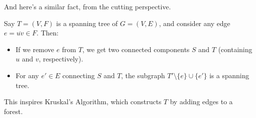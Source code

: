 And here's a similar fact, from the cutting perspective.

\begin{claim}
    Say $T = (V, F)$ is a spanning tree of $G = (V, E)$, and consider any edge $e = \overline{uv} \in F$.  Then:
    \begin{itemize}
        \item If we remove $e$ from $T$, we get two connected components $S$ and $T$ (containing $u$ and $v$, respectively).
        \item For any $e' \in E$ connecting $S$ and $T$, the subgraph $T' \setminus \{ e \} \cup \{e'\}$ is a spanning tree.
    \end{itemize}
\end{claim}




    


    

This inspires Kruskal's Algorithm, which constructs $T$ by adding edges to a forest.

